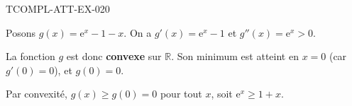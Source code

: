 \begin{corrige}{TCOMPL-ATT-EX-020}


Posons $g(x) = \mathrm{e}^x - 1 - x$. On a $g'(x) = \mathrm{e}^x - 1$ et $g''(x) = \mathrm{e}^x > 0$.

La fonction $g$ est donc \textbf{convexe} sur $\mathbb{R}$. Son minimum est atteint en $x=0$ (car $g'(0)=0$), et $g(0) = 0$.

Par convexité, $g(x) \geq g(0) = 0$ pour tout $x$, soit $\mathrm{e}^x \geq 1 + x$.

\end{corrige}
